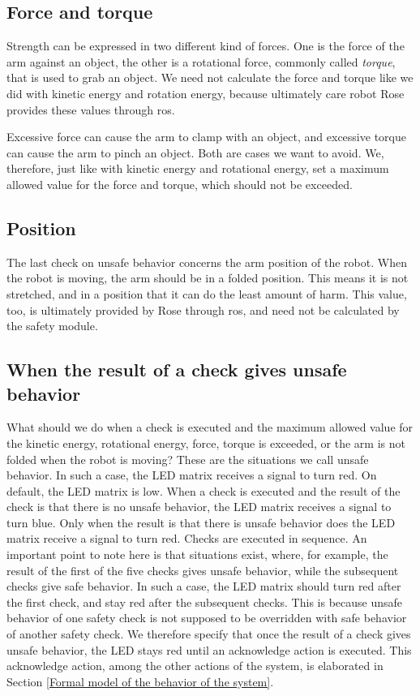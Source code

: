 \documentclass[12pt]{scrreprt}
\begin{document}
\subsection{Force and torque}
Strength can be expressed in two different kind of forces. One is the force of the arm against an object, the other is a rotational force, commonly called \textit{torque}, that is used to grab an object. We need not calculate the force and torque like we did with kinetic energy and rotation energy, because ultimately care robot Rose provides these values through \acrshort{ros}.
\par
Excessive force can cause the arm to clamp with an object, and excessive torque can cause the arm to pinch an object. Both are cases we want to avoid. We, therefore, just like with kinetic energy and rotational energy, set a maximum allowed value for the force and torque, which should not be exceeded.

\subsection{Position}
The last check on unsafe behavior concerns the arm position of the robot. When the robot is moving, the arm should be in a folded position. This means it is not stretched, and in a position that it can do the least amount of harm. This value, too, is ultimately provided by Rose through \acrshort{ros}, and need not be calculated by the safety module.

\subsection{When the result of a check gives unsafe behavior}
\label{When the result of a check gives unsafe behavior}
What should we do when a check is executed and the maximum allowed value for the kinetic energy, rotational energy, force, torque is exceeded, or the arm is not folded when the robot is moving? 
These are the situations we call unsafe behavior. In such a case, the LED matrix receives a signal to turn red. On default, the LED matrix is low. When a check is executed and the result of the check is that there is no unsafe behavior, the LED matrix receives a signal to turn blue. Only when the result is that there is unsafe behavior does the LED matrix receive a signal to turn red. Checks are executed in sequence. An important point to note here is that situations exist, where, for example, the result of the first of the five checks gives unsafe behavior, while the subsequent checks give safe behavior. In such a case, the LED matrix should turn red after the first check, and stay red after the subsequent checks. This is because unsafe behavior of one safety check is not supposed to be overridden with safe behavior of another safety check. We therefore specify that once the result of a check gives unsafe behavior, the LED stays red until an acknowledge action is executed. This acknowledge action, among the other actions of the system, is elaborated in Section \ref{Formal model of the behavior of the system}.
\end{document}
